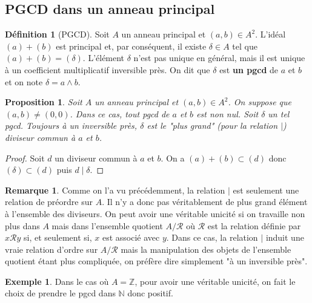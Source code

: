\documentclass[french]{book}
\newcommand{\N}{\mathbb{N}}
\newcommand{\Z}{\mathbb{Z}}
\theoremstyle{plain}
\newtheorem{prop}{Proposition}[chapter]
\theoremstyle{definition}
\newtheorem{dfn}{Définition}[chapter]
\newtheorem{exa}{Exemple}[chapter]
\newtheorem{rmq}{Remarque}[chapter]
\theoremstyle{remark}
\begin{document}
\subsection{PGCD dans un anneau principal}
\begin{dfn}[PGCD]
	Soit $A$ un anneau principal et $(a,b)\in A^2$. L'idéal $(a)+(b)$ est principal et, par conséquent, il existe $\delta\in A$ tel que $(a)+(b)=(\delta)$. L'élément $\delta$ n'est pas unique en général, mais il est unique à un coefficient multiplicatif inversible près. On dit que $\delta$ est \textbf{un pgcd} de $a$ et $b$ et on note $\delta=a\wedge b$.
\end{dfn}
\begin{prop}
	Soit $A$ un anneau principal et $(a,b)\in A^2$. On suppose que $(a,b)\ne(0,0)$. Dans ce cas, tout pgcd de $a$ et $b$ est non nul. Soit $\delta$ un tel pgcd. Toujours à un inversible près, $\delta$ est le "plus grand" (pour la relation $\mid$) diviseur commun à $a$ et $b$.
\end{prop}
\begin{proof}
	Soit $d$ un diviseur commun à $a$ et $b$. On a $(a)+(b)\subset(d)$ donc $(\delta)\subset(d)$ puis $d\mid \delta$.
\end{proof}
\begin{rmq}
	Comme on l'a vu précédemment, la relation $\mid$ est seulement une relation de préordre sur $A$. Il n'y a donc pas véritablement de plus grand élément à l'ensemble des diviseurs. On peut avoir une véritable unicité si on travaille non plus dans $A$ mais dans l'ensemble quotient $A/\mathcal{R}$ où $\mathcal{R}$ est la relation définie par $x\mathcal{R}y$ si, et seulement si, $x$ est associé avec $y$. Dans ce cas, la relation $\mid$ induit une vraie relation d'ordre sur $A/\mathcal{R}$ mais la manipulation des objets de l'ensemble quotient étant plus compliquée, on préfère dire simplement "à un inversible près".
\end{rmq}
\begin{exa}
	Dans le cas où $A=\Z$, pour avoir une véritable unicité, on fait le choix de prendre le pgcd dans $\N$ donc positif.
\end{exa}
\end{document}
